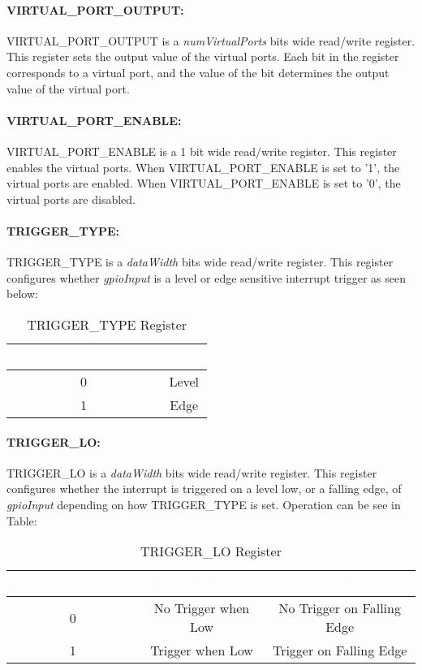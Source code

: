 \paragraph{VIRTUAL\_PORT\_OUTPUT:}
VIRTUAL\_PORT\_OUTPUT is a \textit{numVirtualPorts} bits wide read/write register. This register sets the output value of the virtual ports.
Each bit in the register corresponds to a virtual port, and the value of the bit determines the output value of the virtual port.

\paragraph{VIRTUAL\_PORT\_ENABLE:}
VIRTUAL\_PORT\_ENABLE is a 1 bit wide read/write register. This register enables the virtual ports. When VIRTUAL\_PORT\_ENABLE is set to '1', the virtual ports are enabled.
When VIRTUAL\_PORT\_ENABLE is set to '0', the virtual ports are disabled.

\paragraph{TRIGGER\_TYPE:}
TRIGGER\_TYPE is a \textit{dataWidth} bits wide read/write register. This register configures whether \textit{gpioInput} is a level or edge sensitive
interrupt trigger as seen below:
\begin{table}[h]
  \centering
  \begin{tabular}{|c|c|}
      \hline
      \rowcolor{dark-gray}  %
      \textcolor{white}{\textbf{TRIGGER\_TYPE[n]}} & \textcolor{white}{\textbf{Type}} \\ \hline
      0 & Level \\ \hline
      1 & Edge \\ \hline
  \end{tabular}
  \caption{TRIGGER\_TYPE Register}
\end{table}

\newpage

\paragraph{TRIGGER\_LO:}
TRIGGER\_LO is a \textit{dataWidth} bits wide read/write register. This register configures whether the interrupt is triggered on a level low, or a falling edge, 
of \textit{gpioInput} depending on how TRIGGER\_TYPE is set. Operation can be see in Table:
\begin{table}[h]
  \centering
  \begin{tabular}{|c|c|c|}
      \hline
      \rowcolor{dark-gray}  %
      \textcolor{white}{\textbf{TRIGGER\_LO[n]}} & \textcolor{white}{\textbf{Level Trigger}} & \textcolor{white}{\textbf{Edge Trigger}} \\ \hline
      0 & No Trigger when Low & No Trigger on Falling Edge\\ \hline
      1 & Trigger when Low & Trigger on Falling Edge\\ \hline
  \end{tabular}
  \caption{TRIGGER\_LO Register}
\end{table}

